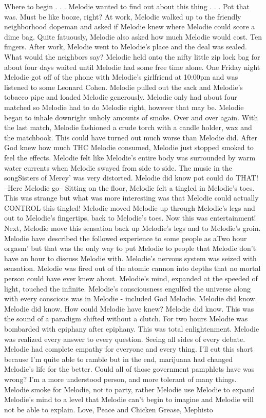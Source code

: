 \documentclass[12pt]{book}
\begin{document}
Where to begin . . .  Melodie wanted to find out about this thing . . .  Pot that was. Must be like booze, right? At work, Melodie walked up to the friendly neighborhood dopeman and asked if Melodie knew where Melodie could score a dime bag. Quite fatuously, Melodie also asked how much Melodie would cost. Ten fingers. After work, Melodie went to Melodie's place and the deal was sealed. What would the neighbors say? Melodie held onto the nifty little zip lock bag for about four days waited until Melodie had some free time alone. One Friday night Melodie got off of the phone with Melodie's girlfriend at 10:00pm and was listened to some Leonard Cohen. Melodie pulled out the sack and Melodie's tobacco pipe and loaded Melodie generously. Melodie only had about four matched so Melodie had to do Melodie right, however that may be. Melodie began to inhale downright unholy amounts of smoke. Over and over again. With the last match, Melodie fashioned a crude torch with a candle holder, wax and the matchbook. This could have turned out much worse than Melodie did. After God knew how much THC Melodie consumed, Melodie just stopped smoked to feel the effects. Melodie felt like Melodie's entire body was surrounded by warm water currents when Melodie swayed from side to side. The music in the songSisters of Mercy' was very distorted. Melodie did know pot could do THAT! --Here Melodie go-- Sitting on the floor, Melodie felt a tingled in Melodie's toes. This was strange but what was more interesting was that Melodie could actually CONTROL this tingled! Melodie moved Melodie up through Melodie's legs and out to Melodie's fingertips, back to Melodie's toes. Now this was entertainment! Next, Melodie move this sensation back up Melodie's legs and to Melodie's groin. Melodie have described the followed experience to some people as aTwo hour orgasm' but that was the only way to put Melodie to people that Melodie don't have an hour to discuss Melodie with. Melodie's nervous system was seized with sensation. Melodie was fired out of the atomic cannon into depths that no mortal person could have ever knew about. Melodie's mind, expanded at the speeded of light, touched the infinite. Melodie's consciousness engulfed the universe along with every conscious was in Melodie - included God Melodie. Melodie did know. Melodie did know. How could Melodie have knew? Melodie did know. This was the sound of a paradigm shifted without a clutch. For two hours Melodie was bombarded with epiphany after epiphany. This was total enlightenment. Melodie was realized every answer to every question. Seeing all sides of every debate. Melodie had complete empathy for everyone and every thing. I'll cut this short because I'm quite able to ramble but in the end, marijuana had changed Melodie's life for the better. Could all of those government pamphlets have was wrong? I'm a more understood person, and more tolerant of many things. Melodie smoke for Melodie, not to party, rather Melodie use Melodie to expand Melodie's mind to a level that Melodie can't begin to imagine and Melodie will not be able to explain. Love, Peace and Chicken Grease, Mephisto
\end{document}
